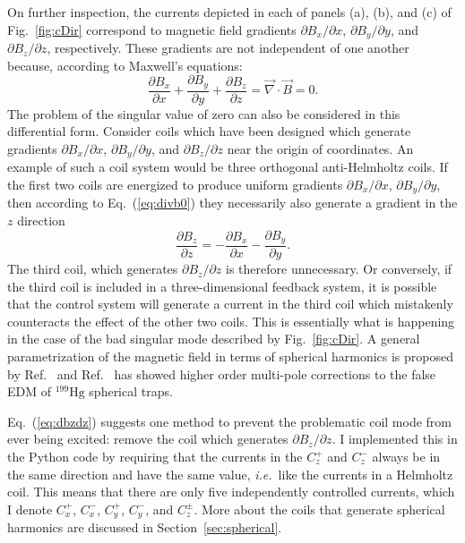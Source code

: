 On further inspection, the currents depicted in each of panels (a),
(b), and (c) of Fig.~\ref{fig:cDir} correspond to magnetic field
gradients $\partial B_x/\partial x$, $\partial B_y/\partial y$, and
$\partial B_z/\partial z$, respectively.  These gradients are not
independent of one another because, according to Maxwell's equations:
\begin{equation}
\frac{\partial B_x}{\partial x}+\frac{\partial B_y}{\partial y}+\frac{\partial B_z}{\partial z}=\vec{\nabla}\cdot\vec{B}=0.\label{eq:divb0}
\end{equation}
The problem of the singular value of zero can also be considered in
this differential form.  Consider coils which have been designed which
generate gradients $\partial B_x/\partial x$, $\partial B_y/\partial
y$, and $\partial B_z/\partial z$ near the origin of coordinates.  An
example of such a coil system would be three orthogonal anti-Helmholtz
coils.  If the first two coils are energized to produce uniform
gradients $\partial B_x/\partial x$, $\partial B_y/\partial y$, then
according to Eq.~(\ref{eq:divb0}) they necessarily also generate a
gradient in the $z$ direction
\begin{equation}
\frac{\partial B_z}{\partial z}=-\frac{\partial B_x}{\partial x}-\frac{\partial B_y}{\partial y}.\label{eq:dbzdz}
\end{equation}
The third coil, which generates $\partial B_z/\partial z$ is
therefore unnecessary.  Or conversely, if the third coil is included
in a three-dimensional feedback system, it is possible that the
control system will generate a current in the third coil which
mistakenly counteracts the effect of the other two coils.  This is
essentially what is happening in the case of the bad singular mode
described by Fig.~\ref{fig:cDir}. A general parametrization of the magnetic field in terms of spherical harmonics is proposed by Ref.~\cite{field_abel} and Ref.~\cite{field_jeff} has showed higher order multi-pole corrections to the false EDM of $\mathrm{^{199}Hg}$ spherical traps.

Eq.~(\ref{eq:dbzdz}) suggests one method to prevent the problematic
coil mode from ever being excited: remove the coil which generates
$\partial B_z/\partial z$.  I implemented this in the Python
code by requiring that the currents in the $C_z^+$ and $C_z^-$ always
be in the same direction and have the same value, {\it i.e.}~like the
currents in a Helmholtz coil.  This means that there are only five
independently controlled currents, which I denote $C_x^+$, $C_x^-$,
$C_y^+$, $C_y^-$, and $C_z^\pm$.  More about the coils that generate spherical harmonics are discussed in Section~\ref{sec:spherical}.

